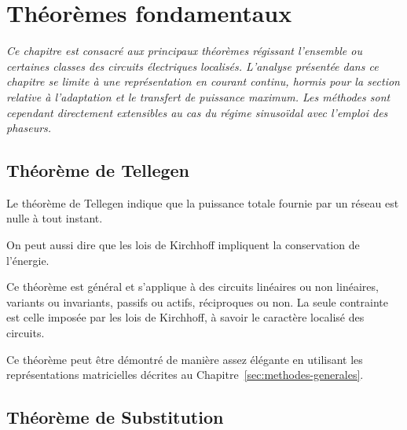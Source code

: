 
\chapter{Théorèmes fondamentaux}
\label{sec:theoremes}

\textit{Ce chapitre est consacré aux principaux théorèmes régissant l'ensemble ou certaines
classes des circuits électriques localisés. 
L'analyse présentée dans ce chapitre se limite à une représentation  en courant continu, hormis pour la section relative à l'adaptation et le transfert de puissance maximum. Les méthodes sont cependant directement extensibles au cas du régime sinusoïdal avec l'emploi des phaseurs.}

\section{Théorème de Tellegen}
Le théorème de Tellegen indique que la puissance totale fournie par un réseau est nulle à tout instant.

On peut aussi dire que les lois de Kirchhoff impliquent la conservation de l'énergie.

Ce théorème est général et s'applique à des circuits linéaires ou non linéaires, variants ou
invariants, passifs ou actifs, réciproques ou non. La seule contrainte est celle imposée
par les lois de Kirchhoff, à savoir le caractère localisé des circuits.

Ce théorème peut être démontré de manière assez élégante en utilisant les représentations matricielles décrites au Chapitre~\ref{sec:methodes-generales}. 

\section{Théorème de Substitution}

